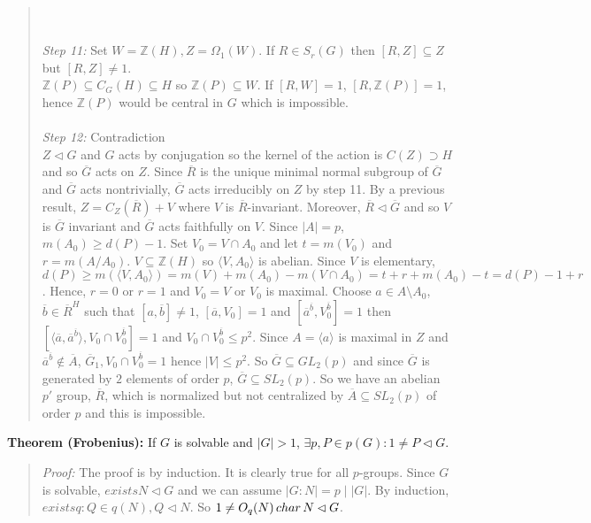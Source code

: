 \begin{quote}
\\
\\
\emph{Step 11:}  Set $W= {\mathbb Z}(H), Z= \Omega_1(W)$.  If $R \in S_r(G)$ then
$[R, Z] \subseteq Z$ but $[R, Z] \ne 1$.
\\
${\mathbb Z}(P) \subseteq C_G(H) \subseteq H$ so ${\mathbb Z}(P) \subseteq W$.
If $[R, W] = 1$, $[R, {\mathbb Z}(P)] = 1$, hence
${\mathbb Z}(P)$ would be central in $G$ which is impossible.
\\
\\
\emph{Step 12:} Contradiction
\\
$Z \lhd G$ and $G$ acts by conjugation so the kernel of the action is $C(Z) \supset H$
and so ${\overline G}$ acts on $Z$.
Since ${\overline R}$ is the unique minimal normal subgroup of ${\overline G}$ and
${\overline G}$ acts nontrivially,
${\overline G}$ acts irreducibly on $Z$ by step 11.
By a previous result, $Z= C_Z({\overline R}) + V$ where $V$ is
${\overline R}$-invariant.
Moreover,
$ {\overline R} \lhd {\overline G} $ and so $V$ is
$ {\overline G} $ invariant and 
$ {\overline G} $ acts faithfully on $V$.
Since $|A|=p$, $m(A_0) \ge d(P) -1$.  Set $V_0= V \cap A_0$ and let $t= m(V_0 )$ and
$r= m(A/A_0)$.  $V \subseteq {\mathbb Z}(H)$ so $ \langle V, A_0 \rangle $ is abelian.
Since $V$ is elementary, $d(P) \ge m( \langle V, A_0 \rangle) = m(V)+m(A_0)- m(V \cap A_0)= t+r +
m(A_0)-t= d(P)-1+r$.  Hence, $r=0$ or $r=1$ and $V_0=V$ or $V_0$ is maximal.
Choose $a \in A \setminus A_0$, ${\overline b} \in {\overline R}^H$
such that
$[a, {\overline b}] \ne 1$,
$[{\overline a}, V_0] = 1$ and
$[{\overline a}^{\overline b}, V_0^{\overline b}] = 1$ then
$[\langle {\overline a}, {\overline a}^{\overline b} \rangle , V_0 \cap V_0^{\overline b}] = 1$ 
and $V_0 \cap V_0^{\overline b} \le p^2$.  Since $A= \langle a \rangle $ is maximal in $Z$ and
${\overline a}^{\overline b} \notin {\overline A}$, 
${\overline G}_1, V_0 \cap V_0^{\overline b} = 1$ hence $|V| \le p^2$.
So ${\overline G} \subseteq GL_2(p)$ and since
${\overline G}$ is generated by $2$ elements of order $p$, ${\overline G} \subseteq SL_2(p)$.
So we have an abelian $p'$ group, ${\overline R}$, which is normalized but not centralized by
${\overline A} \subseteq SL_2(p)$ of order $p$ and this is impossible. 
\end{quote}
{\bf Theorem (Frobenius):}  If $G$ is solvable and $|G| > 1$, 
$\exists p, P \in p(G): 1 \ne P \lhd G$.
\begin{quote}
\emph{Proof:}  
The proof is by induction.  It is clearly true for all $p$-groups.   Since $G$ is solvable,
$exists N \lhd G$ and we can assume $|G:N|= p \mid |G|$.  By induction, $exists q:  Q \in q(N), Q \lhd N$.
So $1 \ne O_q(N) \thinspace char \thinspace N \lhd G$.
\end{quote}
